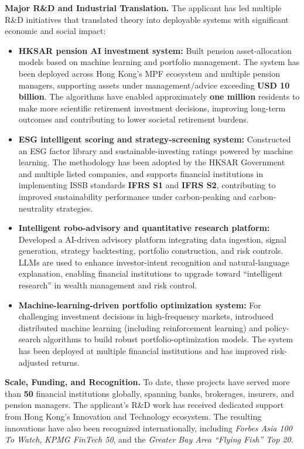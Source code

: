 \documentclass[11pt]{article}
\newenvironment{tightitemize}{%
  \begin{itemize}[leftmargin=*,nosep,topsep=2pt]
}{\end{itemize}}
\begin{document}
\vspace{0.6em}
\textbf{Major R\&D and Industrial Translation.}
The applicant has led multiple R\&D initiatives that translated theory into deployable systems with significant economic and social impact:
\begin{tightitemize}
  \item \textbf{HKSAR pension AI investment system:} Built pension asset-allocation models based on machine learning and portfolio management. The system has been deployed across Hong Kong’s MPF ecosystem and multiple pension managers, supporting assets under management/advice exceeding \textbf{USD 10 billion}. The algorithms have enabled approximately \textbf{one million} residents to make more scientific retirement investment decisions, improving long-term outcomes and contributing to lower societal retirement burdens.
  \item \textbf{ESG intelligent scoring and strategy-screening system:} Constructed an ESG factor library and sustainable-investing ratings powered by machine learning. The methodology has been adopted by the HKSAR Government and multiple listed companies, and supports financial institutions in implementing ISSB standards \textbf{IFRS S1} and \textbf{IFRS S2}, contributing to improved sustainability performance under carbon-peaking and carbon-neutrality strategies.
  \item \textbf{Intelligent robo-advisory and quantitative research platform:} Developed a AI-driven advisory platform integrating data ingestion, signal generation, strategy backtesting, portfolio construction, and risk controls. LLMs are used to enhance investor-intent recognition and natural-language explanation, enabling financial institutions to upgrade toward ``intelligent research'' in wealth management and risk control.
  \item \textbf{Machine-learning-driven portfolio optimization system:} For challenging investment decisions in high-frequency markets, introduced distributed machine learning (including reinforcement learning) and policy-search algorithms to build robust portfolio-optimization models. The system has been deployed at multiple financial institutions and has improved risk-adjusted returns.
\end{tightitemize}

\textbf{Scale, Funding, and Recognition.}
To date, these projects have served more than \textbf{50} financial institutions globally, spanning banks, brokerages, insurers, and pension managers. The applicant’s R\&D work has received dedicated support from Hong Kong’s Innovation and Technology ecosystem. The resulting innovations have also been recognized internationally, including \emph{Forbes Asia 100 To Watch}, \emph{KPMG FinTech 50}, and the \emph{Greater Bay Area ``Flying Fish'' Top 20}.
\end{document}

